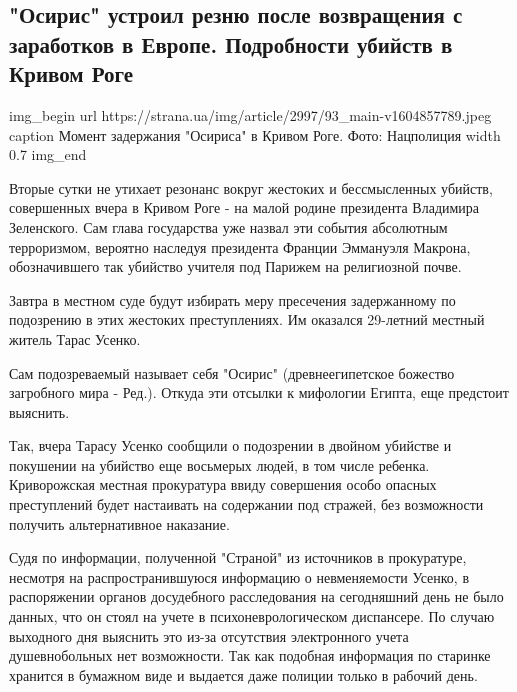  
 
 

\subsection{"Осирис" устроил резню после возвращения с заработков в Европе. Подробности убийств в Кривом Роге}
\label{sec:08_11_2020.news.ua.strana.1.osiris_krivoj_rog}


\ifcmt
img_begin 
	url https://strana.ua/img/article/2997/93_main-v1604857789.jpeg
	caption Момент задержания "Осириса" в Кривом Роге. Фото: Нацполиция 
	width 0.7
img_end
\fi

Вторые сутки не утихает резонанс вокруг жестоких и бессмысленных убийств,
совершенных вчера в Кривом Роге - на малой родине президента Владимира
Зеленского. Сам глава государства уже назвал эти события абсолютным
терроризмом, вероятно наследуя президента Франции Эммануэля Макрона,
обозначившего так убийство учителя под Парижем на религиозной почве.

Завтра в местном суде будут избирать меру пресечения задержанному по подозрению
в этих жестоких преступлениях. Им оказался 29-летний местный житель Тарас
Усенко.

Сам подозреваемый называет себя "Осирис" (древнеегипетское божество загробного
мира - Ред.). Откуда эти отсылки к мифологии Египта, еще предстоит выяснить.

Так, вчера Тарасу Усенко сообщили о подозрении в двойном убийстве и покушении
на убийство еще восьмерых людей, в том числе ребенка. Криворожская местная
прокуратура ввиду совершения особо опасных преступлений  будет настаивать на
содержании под стражей, без возможности получить альтернативное наказание.

Судя по информации, полученной "Страной" из источников в прокуратуре, несмотря
на распространившуюся информацию о невменяемости Усенко, в распоряжении органов
досудебного расследования на сегодняшний день не было данных, что он стоял на
учете в психоневрологическом диспансере. По случаю выходного дня выяснить это
из-за отсутствия электронного учета душевнобольных нет возможности. Так как
подобная информация по старинке хранится в бумажном виде и выдается даже
полиции только в рабочий день.

